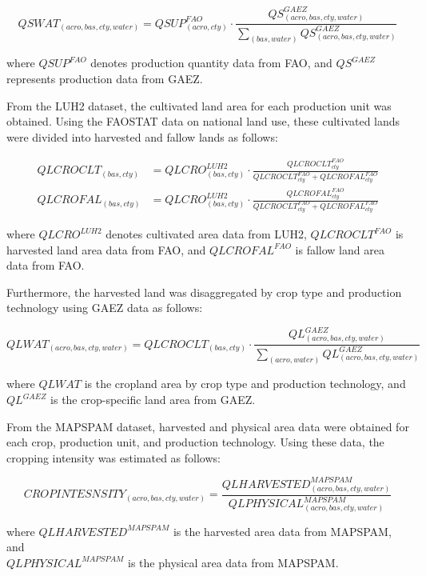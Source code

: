 \begin{equation}
QSWAT_{(acro,bas,cty,water)} = 
QSUP^{FAO}_{(acro,cty)} \cdot 
\frac{QS^{GAEZ}_{(acro,bas,cty,water)}}{\sum_{(bas,water)} QS^{GAEZ}_{(acro,bas,cty,water)}}
\end{equation}

where \( QSUP^{FAO} \) denotes production quantity data from FAO, 
and \( QS^{GAEZ} \) represents production data from GAEZ.

From the LUH2 dataset, the cultivated land area for each production unit was obtained. 
Using the FAOSTAT data on national land use, these cultivated lands were divided into harvested and fallow lands as follows:

\begin{align}
QLCROCLT_{(bas,cty)} &= 
QLCRO^{LUH2}_{(bas,cty)} \cdot 
\frac{QLCROCLT^{FAO}_{cty}}{QLCROCLT^{FAO}_{cty} + QLCROFAL^{FAO}_{cty}} \\
QLCROFAL_{(bas,cty)} &= 
QLCRO^{LUH2}_{(bas,cty)} \cdot 
\frac{QLCROFAL^{FAO}_{cty}}{QLCROCLT^{FAO}_{cty} + QLCROFAL^{FAO}_{cty}}
\end{align}

where \( QLCRO^{LUH2} \) denotes cultivated area data from LUH2, 
\( QLCROCLT^{FAO} \) is harvested land area data from FAO, 
and \( QLCROFAL^{FAO} \) is fallow land area data from FAO.

Furthermore, the harvested land was disaggregated by crop type and production technology 
using GAEZ data as follows:

\begin{equation}
QLWAT_{(acro,bas,cty,water)} = 
QLCROCLT_{(bas,cty)} \cdot 
\frac{QL^{GAEZ}_{(acro,bas,cty,water)}}{\sum_{(acro,water)} QL^{GAEZ}_{(acro,bas,cty,water)}}
\end{equation}

where \( QLWAT \) is the cropland area by crop type and production technology, 
and \( QL^{GAEZ} \) is the crop-specific land area from GAEZ.

From the MAPSPAM dataset, harvested and physical area data were obtained for each crop, 
production unit, and production technology. 
Using these data, the cropping intensity was estimated as follows:

\begin{equation}
CROPINTESNSITY_{(acro,bas,cty,water)} = 
\frac{QLHARVESTED^{MAPSPAM}_{(acro,bas,cty,water)}}{QLPHYSICAL^{MAPSPAM}_{(acro,bas,cty,water)}}
\end{equation}

where \( QLHARVESTED^{MAPSPAM} \) is the harvested area data from MAPSPAM, and \\
\( QLPHYSICAL^{MAPSPAM} \) is the physical area data from MAPSPAM.

